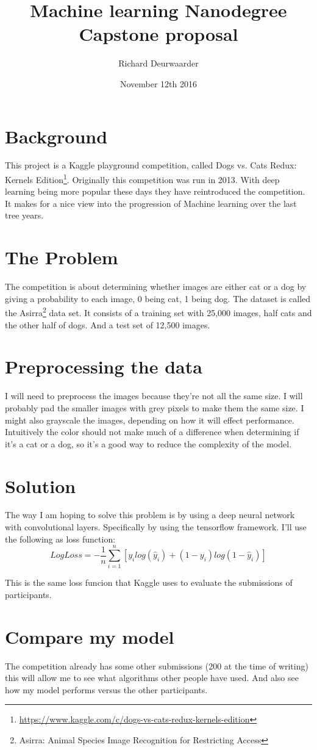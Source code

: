 \documentclass[11pt]{article}
\title{\textbf{Machine learning Nanodegree\\ Capstone proposal}}
\author{Richard Deurwaarder}
\date{November 12th 2016}
\begin{document}
\maketitle

\section{Background}
This project is a Kaggle playground competition, called Dogs vs. Cats Redux: Kernels Edition\footnote{\url{https://www.kaggle.com/c/dogs-vs-cats-redux-kernels-edition}}. Originally this competition was run in 2013. With deep learning being more popular these days they have reintroduced the competition. It makes for a nice view into the  progression of Machine learning over the last tree years.
\section{The Problem}
The competition is about determining whether images are either cat or a dog by giving a probability to each image, 0 being cat, 1 being dog. The dataset is called the Asirra\footnote{Asirra: Animal Species Image Recognition for Restricting Access} data set. It consists of a training set with 25,000 images, half cats and the other half of dogs. And a test set of 12,500 images.
\section{Preprocessing the data}
I will need to preprocess the images because they're not all the same size. I will probably pad the smaller images with grey pixels to make them the same size. I might also grayscale the images, depending on how it will effect performance. Intuitively the color should not make much of a difference when determining if it's a cat or a dog, so it's a good way to reduce the complexity of the model.
\section{Solution}
The way I am hoping to solve this problem is by using a deep neural network with convolutional layers. Specifically by using the tensorflow framework. I'll use the following as loss function: 
\[ LogLoss = -\dfrac{1}{n}\sum\limits^{n}_{i=1}[y_i log(\hat{y}_i) + (1-y_i)log(1-\hat{y}_i)]
\]

This is the same loss funcion that Kaggle uses to evaluate the submissions of participants.

\section{Compare my model}
The competition already has some other submissions (200 at the time of writing) this will allow me to see what algorithms other people have used. And also see how my model performs versus the other participants.
\end{document}
